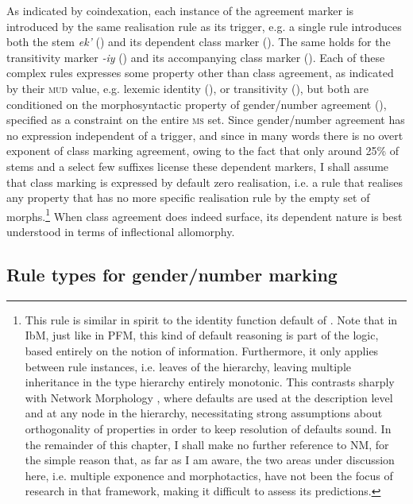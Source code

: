 \documentclass[output=paper]{langsci/langscibook}
\begin{document}
As indicated by coindexation, each instance of the agreement marker is
introduced by the same realisation rule as its trigger, e.g. a single
rule introduces both the stem \textit{ek'} (\negmedspace{}) and its
dependent class marker (\negmedspace{}). The same holds for the
transitivity marker \textit{-iy} (\negmedspace{}) and its accompanying
class marker (\negmedspace{}). Each of these complex rules expresses some
property other than class agreement, as indicated by their
\textsc{mud} value, e.g. lexemic identity (\negmedspace{}), or
transitivity (\negmedspace{}), but both are conditioned on the
morphosyntactic property of gender/number agreement (\negmedspace{}),
specified as a constraint on the entire \textsc{ms} set. Since
gender/number agreement has no expression independent of a trigger,
and since in many words there is no overt exponent of class marking
agreement, owing to the fact that only around 25\% of stems and a
select few suffixes license these dependent markers, I shall assume
that class marking is expressed by default zero realisation, i.e. a
rule that realises any property that has no more specific realisation
rule by the empty set of morphs.\footnote{This rule is similar in
  spirit to the identity function default of \citet{Stump01}. Note
  that in IbM, just like in PFM, this kind of default reasoning is
  part of the logic, based entirely on the notion of
  information. Furthermore, it only applies between rule instances,
  i.e. leaves of the hierarchy, leaving multiple inheritance in the
  type hierarchy entirely monotonic. This contrasts sharply with
  Network Morphology \citep[=NM][]{Brown11}, where defaults are used
  at the description level and at any node in the hierarchy,
  necessitating strong assumptions about orthogonality of properties
  in order to keep resolution of defaults sound. In the remainder of
  this chapter, I shall make no further reference to NM, for the
  simple reason that, as far as I am aware, the two areas under
  discussion here, i.e. multiple exponence and morphotactics, have not
  been the focus of research in that framework, making
  it difficult to assess its predictions. } When class agreement does
indeed surface, its dependent nature is best understood in terms of
inflectional allomorphy.

\subsection{Rule types for gender/number marking}\largerpage
\end{document}
